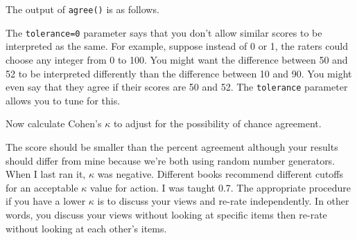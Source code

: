 The output of \texttt{agree()} is as follows.

\begin{Shaded}
\begin{Highlighting}[]
\NormalTok{ (}\NormalTok{)}

\OtherTok{=} 
\OtherTok{=} 
\NormalTok{  \%}\SpecialCharTok{{-}}\OtherTok{=} 
\end{Highlighting}
\end{Shaded}

The \texttt{tolerance=0} parameter says that you don't allow similar
scores to be interpreted as the same. For example, suppose instead of 0
or 1, the raters could choose any integer from 0 to 100. You might want
the difference between 50 and 52 to be interpreted differently than the
difference between 10 and 90. You might even say that they agree if
their scores are 50 and 52. The \texttt{tolerance} parameter allows you
to tune for this.

Now calculate Cohen's \(\kappa\) to adjust for the possibility of chance
agreement.

\begin{Shaded}
\begin{Highlighting}[]
\end{Highlighting}
\end{Shaded}

\begin{Shaded}
\begin{Highlighting}[]


\end{Highlighting}
\end{Shaded}

The score should be smaller than the percent agreement although your
results should differ from mine because we're both using random number
generators. When I last ran it, \(\kappa\) was negative. Different books
recommend different cutoffs for an acceptable \(\kappa\) value for
action. I was taught 0.7. The appropriate procedure if you have a lower
\(\kappa\) is to discuss your views and re-rate independently. In other
words, you discuss your views without looking at specific items then
re-rate without looking at each other's items.

